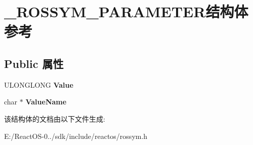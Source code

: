 \hypertarget{struct___r_o_s_s_y_m___p_a_r_a_m_e_t_e_r}{}\section{\+\_\+\+R\+O\+S\+S\+Y\+M\+\_\+\+P\+A\+R\+A\+M\+E\+T\+E\+R结构体 参考}
\label{struct___r_o_s_s_y_m___p_a_r_a_m_e_t_e_r}
\subsection*{Public 属性}
\begin{DoxyCompactItemize}
\item 
\mbox{\label{struct___r_o_s_s_y_m___p_a_r_a_m_e_t_e_r_a329adc5030a97fb7c812e0dce219a6c6}} 
U\+L\+O\+N\+G\+L\+O\+NG {\bfseries Value}
\item 
\mbox{\label{struct___r_o_s_s_y_m___p_a_r_a_m_e_t_e_r_aa93c47a42b6f51a05edca2b78d1b3671}} 
char $\ast$ {\bfseries Value\+Name}
\end{DoxyCompactItemize}


该结构体的文档由以下文件生成\+:\begin{DoxyCompactItemize}
\item 
E\+:/\+React\+O\+S-\/0../sdk/include/reactos/rossym.\+h\end{DoxyCompactItemize}
